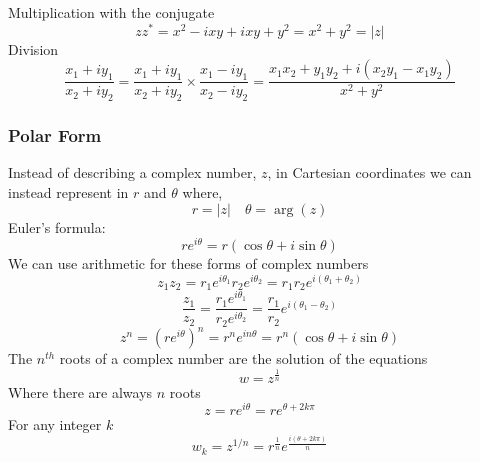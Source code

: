 \documentclass[11pt,titlepage]{article}
\numberwithin{equation}{section}
\begin{document}
Multiplication with the conjugate
\begin{equation}
zz^{*}=x^2-ixy+ixy+y^2=x^2+y^2=|z|
\end{equation}
Division
\begin{equation}
    \frac{x_{1}+iy_{1}}{x_{2}+iy_{2}}=\frac{x_{1}+iy_{1}}{x_{2}+iy_{2}}\times\frac{x_{1}-iy_{1}}{x_{2}-iy_{2}}=\frac{x_{1}x_{2}+y_{1}y_{2}+i(x_{2}y_{1}-x_{1}y_{2})}{x^2+y^2}
\end{equation}
\subsubsection{Polar Form}
Instead of describing a complex number, $z$, in Cartesian coordinates we can instead represent in $r$ and $\theta$ where,
\begin{equation}
    r=|z| \quad \theta=\arg(z)
\end{equation}
Euler's formula:
\begin{equation}
    re^{i\theta}=r(\cos \theta+i\sin \theta)
\end{equation}
We can use arithmetic for these forms of complex numbers
\begin{equation}
    z_{1}z_{2}=r_{1}e^{i\theta_{1}}r_{2}e^{i\theta_{2}}=r_{1}r_{2}e^{i(\theta_{1}+\theta_{2})}
\end{equation}
\begin{equation}
    \frac{z_{1}}{z_{2}}=\frac{r_{1}e^{i\theta_{1}}}{r_{2}e^{i\theta_{2}}}=\frac{r_{1}}{r_{2}}e^{i(\theta_{1}-\theta_{2})}
\end{equation}
\begin{equation}
    z^n=(re^{i\theta})^n=r^ne^{in\theta}=r^n(\cos \theta +i\sin \theta)
\end{equation}
The $n^{th}$ roots of a complex number are the solution of the equations 
\begin{equation}
    w=z^{\frac{1}{n}}
\end{equation}
Where there are always $n$ roots
\begin{equation}
    z=re^{i \theta}=re^{\theta+2k\pi} 
\end{equation}
For any integer $k$
\begin{equation}
    w_{k}=z^{1/n}=r^{\frac{1}{n}}e^{\frac{i(\theta+2k\pi)}{n}}
\end{equation}
\end{document}
